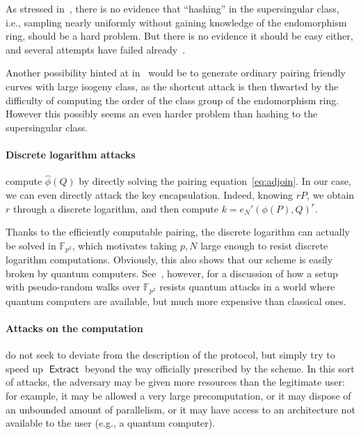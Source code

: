 \documentclass{llncs}
\newcommand{\F}{\mathbb{F}}
\DeclareMathOperator{\Extract}{\mathsf{Extract}}
\begin{document}
As stressed in~\cite{10.1007/978-3-030-34578-5_10}, there is no
evidence that ``hashing'' in the supersingular class, i.e., sampling
nearly uniformly without gaining knowledge of the endomorphism ring,
should be a hard problem. %
But there is no evidence it should be easy either, and several
attempts have failed
already~\cite{cryptoeprint:2019:1202,love2019supersingular}.

Another possibility hinted at in~\cite{10.1007/978-3-030-34578-5_10}
would be to generate ordinary pairing friendly curves with large
isogeny class, as the shortcut attack is then thwarted by the
difficulty of computing the order of the class group of the
endomorphism ring. %
However this possibly seems an even harder problem than hashing to the
supersingular class.

\paragraph{Discrete logarithm attacks} compute $\hat\phi(Q)$ by
directly solving the pairing equation~\eqref{eq:adjoin}. %
In our case, we can even directly attack the key encapsulation. %
Indeed, knowing $rP$, we obtain $r$ through a discrete logarithm, and
then compute $k=e_N'(\phi(P),Q)^r$.

Thanks to the efficiently computable pairing, the discrete logarithm
can actually be solved in $\F_{p^2}$, which motivates taking $p,N$
large enough to resist discrete logarithm computations. %
Obviously, this also shows that our scheme is easily broken by quantum
computers. %
See~\cite{10.1007/978-3-030-34578-5_10}, however, for a discussion of
how a setup with pseudo-random walks over $\F_{p^2}$ resists quantum
attacks in a world where quantum computers are available, but much
more expensive than classical ones.

\paragraph{Attacks on the computation} do not seek to deviate from the
description of the protocol, but simply try to speed up $\Extract$
beyond the way officially prescribed by the scheme. %
In this sort of attacks, the adversary may be given more resources
than the legitimate user: for example, it may be allowed a very large
precomputation, or it may dispose of an unbounded amount of
parallelism, or it may have access to an architecture not available to
the user (e.g., a quantum computer).
\end{document}
